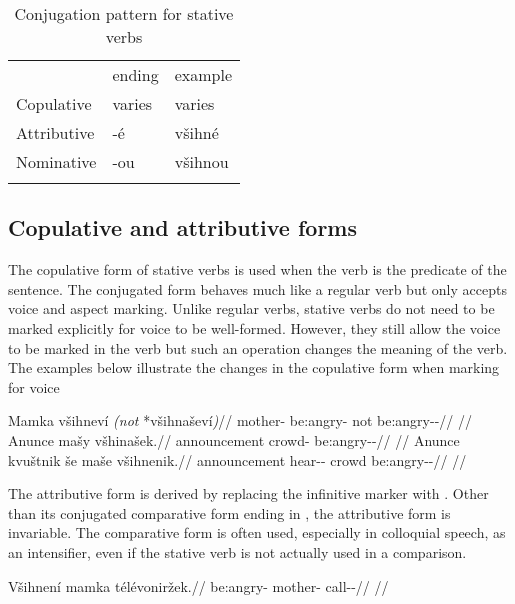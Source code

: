 \begin{table}[ht]
	\sffamily\footnotesize
	\caption{Conjugation pattern for stative verbs}
	\medskip
	\begin{tabu} to 0.7
		\toprule
		&{\sc ending}&{\sc example}\\\addlinespace
		\midrule\addlinespace
		Copulative & varies & varies\\\addlinespace
		Attributive & {-é} & {všihné}\\\addlinespace
		Nominative & {-ou}	& {všihnou}\\\addlinespace
		\bottomrule
	\end{tabu}
\end{table}

\subsection{Copulative and attributive forms}

The copulative form of stative verbs is used when the verb is the predicate of
the sentence. The conjugated form behaves much like a regular verb but only
accepts voice and aspect marking. Unlike regular verbs, stative verbs do not
need to be marked explicitly for voice to be well-formed. However, they still
allow the voice to be marked in the verb but such an operation changes the
meaning of the verb. The examples below illustrate the changes in the copulative form when marking for voice

\pex
\a\begingl
\gla Mamka všihneví \emph{(not} *všihnaševí\emph{)}//
\glb mother-\Dim{} be:angry-\Cont{} not be:angry-\Av{}-\Cont{}//
\glft {}//
\endgl
\a \begingl
\gla Anunce mašy všhinašek.//
\glb announcement crowd-\Acc{} be:angry-\Av{}-\Pf{}//
\glft {}//
\endgl
\a \begingl
\gla Anunce kvuštnik še maše všihnenik.//
\glb announcement hear-\Pv{}-\Pf{} \Com{} crowd be:angry-\Pv{}-\Pf{}//
\glft {}//
\endgl
\xe

The attributive form is derived by replacing the infinitive marker  with
. Other than its conjugated comparative form ending in , the
attributive form is invariable. The comparative form is often used, especially in colloquial speech,
as an intensifier, even if the stative verb is not actually used in a
comparison.

\ex
\begingl
\gla Všihnení mamka télévoniržek.//
\glb be:angry- mother- call-\Av{}-\Pf{}//
\glft {}//
\endgl
\xe

